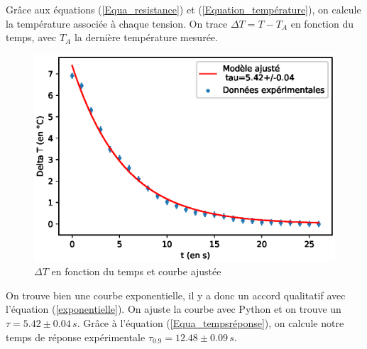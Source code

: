 \documentclass[12pt]{article}
\begin{document}
\newpage
Grâce aux équations (\ref{Equa_resistance}) et (\ref{Equation_température}), on calcule la température associée à chaque tension. On trace $\Delta T=T-T_A$ en fonction du temps, avec $T_A$ la dernière température mesurée.

\begin{figure}[h!]
	\begin{center}
		\includegraphics[scale=0.7]{Tempscara.eps}
		\caption{$\Delta T$ en fonction du temps et courbe ajustée}
		\label{Temps_caractéristique}
	\end{center}
\end{figure}

On trouve bien une courbe exponentielle, il y a donc un accord qualitatif avec l'équation (\ref{exponentielle}). On ajuste la courbe avec Python et on trouve un $\tau = 5.42\pm 0.04\,s$. Grâce à l'équation (\ref{Equa_tempsréponse}), on calcule notre temps de réponse expérimentale $\tau_{0.9}=12.48\pm 0.09\,s$.
\end{document}
